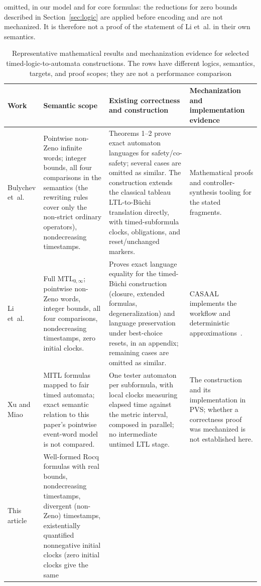\documentclass[manuscript]{acmart}
\begin{document}
omitted, in our model and for core formulas: the
reductions for zero bounds described in Section~\ref{sec:logic} are applied
before encoding and are not mechanized. It is therefore not a proof of the
statement of Li et~al. in their own semantics.
\begin{table}[!t]
\centering
\caption{Representative mathematical results and mechanization evidence for
selected timed-logic-to-automata constructions. The rows have different logics,
semantics, targets, and proof scopes; they are not a performance comparison}
\label{tab:prior-construction-comparison}
\footnotesize\setlength{\tabcolsep}{3pt}
\begin{tabular}{@{}p{}p{}p{}p{}@{}}
\toprule
Work & Semantic scope & Existing correctness and construction & Mechanization and implementation evidence\\
\midrule
Bulychev et~al.~\cite{BDLG14} & Pointwise non-Zeno infinite words; integer bounds, all four comparisons in the semantics (the rewriting rules cover only the non-strict ordinary operators), nondecreasing timestamps. & Theorems 1--2 prove exact automaton languages for safety/co-safety; several cases are omitted as similar. The construction extends the classical tableau LTL-to-B\"uchi translation directly, with timed-subformula clocks, obligations, and reset/unchanged markers. & Mathematical proofs and controller-synthesis tooling for the stated fragments.\\
Li et~al.~\cite{li_spin7} & Full MTL$_{0,\infty}$; pointwise non-Zeno words, integer bounds, all four comparisons, nondecreasing timestamps, zero initial clocks. & Proves exact language equality for the timed-B\"uchi construction (closure, extended formulas, degeneralization) and language preservation under best-choice resets, in an appendix; remaining cases are omitted as similar. & CASAAL implements the workflow and deterministic approximations~\cite{casaal_tool}.\\
Xu and Miao~\cite{xu08} & MITL formulas mapped to fair timed automata; exact semantic relation to this paper's pointwise event-word model is not compared. & One tester automaton per subformula, with local clocks measuring elapsed time against the metric interval, composed in parallel; no intermediate untimed LTL stage. & The construction and its implementation in PVS; whether a correctness proof was mechanized is not established here.\\
This article & Well-formed Rocq formulas with real bounds, nondecreasing timestamps, divergent (non-Zeno) timestamps, existentially quantified nonnegative initial clocks (zero initial clocks give the same

\end{tabular}
\end{table}
\end{document}
